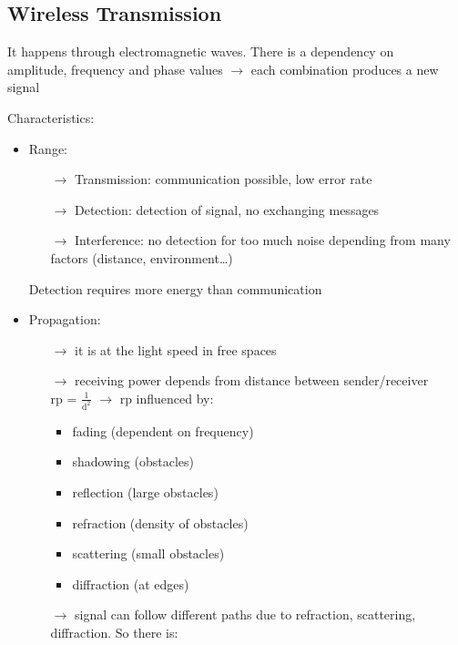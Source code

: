 \subsection{Wireless Transmission}

It happens through electromagnetic waves. There is a dependency on\\amplitude,
frequency and phase values $\rightarrow$ each combination produces a new signal

Characteristics:
\begin{itemize}
    \item Range:
    \begin{itemize}
        \item[$\rightarrow$] Transmission: communication possible, low error rate
        \item[$\rightarrow$] Detection: detection of signal, no exchanging
        messages
        \item[$\rightarrow$] Interference: no detection for too much noise
        depending from many \\factors (distance, environment\dots)
    \end{itemize}
    Detection requires more energy than communication
    \item Propagation:
    \begin{itemize}
        \item[$\rightarrow$] it is at the light speed in free spaces
        \item[$\rightarrow$] receiving power depends from distance between
        sender/receiver\\
        rp = $\frac{1}{\text{d}^2}$ $\rightarrow$ rp influenced by:
        \begin{itemize}
            \item fading (dependent on frequency)
            \item shadowing (obstacles)
            \item reflection (large obstacles)
            \item refraction (density of obstacles)
            \item scattering (small obstacles)
            \item diffraction (at edges)
        \end{itemize}
        \item[$\rightarrow$] signal can follow different paths due to refraction,
        scattering, diffraction. So there is:
        \begin{itemize}

\end{itemize}
\end{itemize}
\end{itemize}
